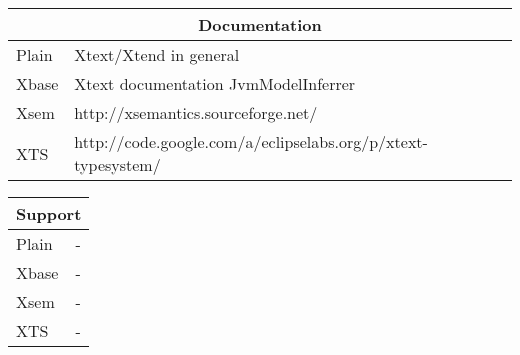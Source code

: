 \begin{frame}
\begin{tabularx}{\linewidth}{ l   X }
\multicolumn{2}{c}{Documentation} \\ \hline
Plain & Xtext/Xtend in general \\
Xbase & Xtext documentation JvmModelInferrer \\
Xsem & http://xsemantics.sourceforge.net/ \\
XTS & http://code.google.com/a/eclipselabs.org/p/xtext-typesystem/ \\
\end{tabularx}

\begin{tabularx}{\linewidth}{ l   X }
\multicolumn{2}{c}{Support} \\ \hline
Plain & - \\
Xbase & - \\
Xsem & - \\
XTS & - \\
\end{tabularx}
  
\end{frame}